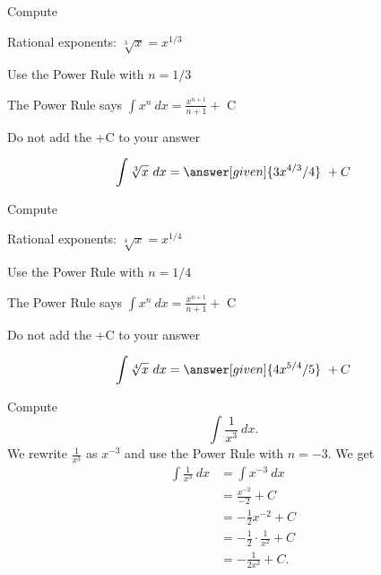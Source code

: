 \documentclass{ximera}
\begin{document}
\begin{problem} %
Compute 

\begin{hint}
Rational exponents: $\sqrt[3]x = x^{1/3}$
\end{hint}
\begin{hint}
Use the Power Rule with $n=1/3$
\end{hint}
\begin{hint}
The Power Rule says $\int x^n \ dx = \frac{x^{n+1}}{n+1} +$ C
\end{hint}
\begin{hint}
\begin{center}
Do not add the +C to your answer
\end{center}
\end{hint}

\[
\int \sqrt[3]x \ dx =
\answer[given]{3x^{4/3} /4} \ + C
\]
\end{problem}


\begin{problem} %
Compute 

\begin{hint}
Rational exponents: $\sqrt[4]x = x^{1/4}$
\end{hint}
\begin{hint}
Use the Power Rule with $n=1/4$
\end{hint}
\begin{hint}
The Power Rule says $\int x^n \ dx = \frac{x^{n+1}}{n+1} +$ C
\end{hint}
\begin{hint}
\begin{center}
Do not add the +C to your answer
\end{center}
\end{hint}

\[
\int \sqrt[4]x \ dx =
\answer[given]{4x^{5/4} /5} \ + C
\]
\end{problem}



\begin{example} %
Compute $$\int \frac{1}{x^3} \ dx.$$
We rewrite $\frac{1}{x^3}$ as $x^{-3}$ and use the Power Rule with $n= -3$.
We get
\begin{align*}
\int \frac{1}{x^3} \ dx &= \int x^{-3} \ dx \\
&= \frac{x^{-2}}{-2} + C\\ 
&= -\tfrac{1}{2}x^{-2} + C \\
&= -\tfrac{1}{2}\cdot\frac{1}{x^2} + C \\
&= -\frac{1}{2x^2} +C.
\end{align*}
\end{example}
\end{document}
